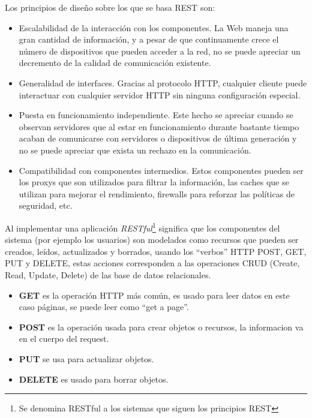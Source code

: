 Los principios de diseño sobre los que se basa REST son:
\begin{itemize}
  \item Escalabilidad de la interacción con los componentes. La Web maneja una gran cantidad de información, y a pesar de que continuamente crece el número de dispositivos que pueden acceder a la red, no se puede apreciar un decremento de la calidad de comunicación existente.

  \item Generalidad de interfaces. Gracias al protocolo HTTP, cualquier cliente puede interactuar con cualquier servidor HTTP sin ninguna configuración especial.

  \item Puesta en funcionamiento independiente. Este hecho se apreciar cuando se observan servidores que al estar en funcionamiento durante bastante tiempo acaban de comunicarse con servidores o dispositivos de última generación y no se puede apreciar que exista un rechazo en la comunicación.

  \item Compatibilidad con componentes intermedios. Estos componentes pueden ser los proxys que son utilizados para filtrar la información, las caches que se utilizan para mejorar el rendimiento, firewalls para reforzar las políticas de seguridad, etc. \cite{rest_web_service}

\end{itemize}

 Al implementar una aplicación \emph{RESTful}\footnote{Se denomina RESTful a los sistemas que siguen los principios REST} significa que los componentes del sistema (por ejemplo los usuarios) son modelados como recursos que pueden ser creados, leídos, actualizados y borrados, usando los ``verbos'' HTTP POST, GET, PUT y DELETE, estas acciones corresponden a las operaciones CRUD (Create, Read, Update, Delete) de las base de datos relacionales.\\

\begin{itemize}
  \item \textbf{GET} es la operación HTTP más común, es usado para leer
  datos en este caso páginas, se puede leer como ``get a page''.
  \item \textbf{POST} es la operación usada para crear objetos o recursos, la informacion va en el cuerpo del request.
  \item \textbf{PUT} se usa para actualizar objetos.
  \item \textbf{DELETE} es usado para borrar objetos.
\end{itemize}

